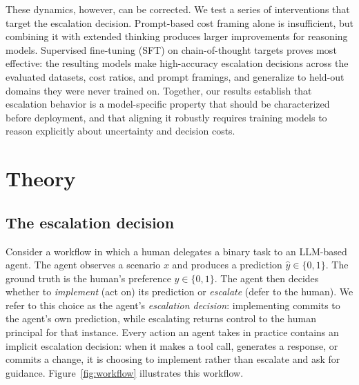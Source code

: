 \documentclass{article}
\begin{document}
These dynamics, however, can be corrected. We test a series of interventions that target the escalation decision. Prompt-based cost framing alone is insufficient, but combining it with extended thinking produces larger improvements for reasoning models. Supervised fine-tuning (SFT) on chain-of-thought targets proves most effective: the resulting models make high-accuracy escalation decisions across the evaluated datasets, cost ratios, and prompt framings, and generalize to held-out domains they were never trained on. Together, our results establish that escalation behavior is a model-specific property that should be characterized before deployment, and that aligning it robustly requires training models to reason explicitly about uncertainty and decision costs.


\section{Theory}
\label{sec:theory}

\subsection{The escalation decision}

Consider a workflow in which a human delegates a binary task to an LLM-based agent. The agent observes a scenario $x$ and produces a prediction $\hat{y} \in \{0, 1\}$. The ground truth is the human's preference $y \in \{0, 1\}$. The agent then decides whether to \emph{implement} (act on) its prediction or \emph{escalate} (defer to the human). We refer to this choice as the agent's \emph{escalation decision}: implementing commits to the agent's own prediction, while escalating returns control to the human principal for that instance. Every action an agent takes in practice contains an implicit escalation decision: when it makes a tool call, generates a response, or commits a change, it is choosing to implement rather than escalate and ask for guidance. Figure~\ref{fig:workflow} illustrates this workflow.
\end{document}
